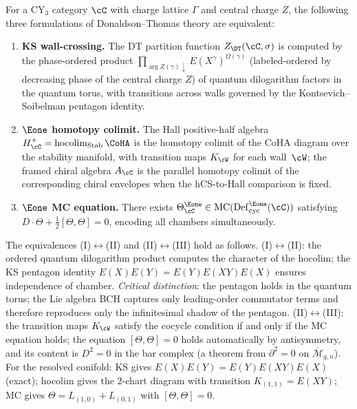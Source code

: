 \begin{theorem}[KS wall-crossing \texorpdfstring{$=$}{=} homotopy colimit \texorpdfstring{$=$}{=} MC gauge equivalence]
\label{thm:ks-mc-gauge}
For a CY$_3$ category $\cC$ with charge lattice $\Gamma$ and central charge $Z$, the following three formulations of Donaldson--Thomas theory are equivalent:
\begin{enumerate}[label=\textup{(\Roman*)}]
 \item \textbf{KS wall-crossing.} The DT partition function $Z_{\DT}(\cC, \sigma)$ is computed by the phase-ordered product $\prod_{\arg Z(\gamma) \downarrow} E(X^\gamma)^{\Omega(\gamma)}$ (labeled-ordered by decreasing phase of the central charge $Z$) of quantum dilogarithm factors in the quantum torus, with transitions across walls governed by the Kontsevich--Soibelman pentagon identity.
 \item \textbf{$\Eone$ homotopy colimit.} The Hall positive-half algebra $H^+_\cC = \operatorname{hocolim}_{\mathrm{Stab}} \CoHA$ is the homotopy colimit of the CoHA diagram over the stability manifold, with transition maps $K_\cW$ for each wall~$\cW$; the framed chiral algebra $A_\cC$ is the parallel homotopy colimit of the corresponding chiral envelopes when the hCS-to-Hall comparison is fixed.
 \item \textbf{$\Eone$ MC equation.} There exists $\Theta^{\Eone}_\cC \in \mathrm{MC}(\mathrm{Def}^{\Eone}_{\mathrm{cyc}}(\cC))$ satisfying $D \cdot \Theta + \frac{1}{2}[\Theta, \Theta] = 0$, encoding all chambers simultaneously.
\end{enumerate}
The equivalences (I)$\leftrightarrow$(II) and (II)$\leftrightarrow$(III) hold as follows. (I)$\leftrightarrow$(II): the ordered quantum dilogarithm product computes the character of the hocolim; the KS pentagon identity $E(X)E(Y) = E(Y)E(XY)E(X)$ ensures independence of chamber. \emph{Critical distinction}: the pentagon holds in the quantum torus; the Lie algebra BCH captures only leading-order commutator terms and therefore reproduces only the infinitesimal shadow of the pentagon. (II)$\leftrightarrow$(III): the transition maps $K_\cW$ satisfy the cocycle condition if and only if the MC equation holds; the equation $[\Theta, \Theta] = 0$ holds automatically by antisymmetry, and its content is $D^2 = 0$ in the bar complex (a theorem from $\partial^2 = 0$ on $\overline{\mathcal{M}}_{g,n}$). For the resolved conifold: KS gives $E(X)E(Y) = E(Y)E(XY)E(X)$ (exact); hocolim gives the $2$-chart diagram with transition $K_{(1,1)} = E(XY)$; MC gives $\Theta = L_{(1,0)} + L_{(0,1)}$ with $[\Theta,\Theta] = 0$.
\end{theorem}


